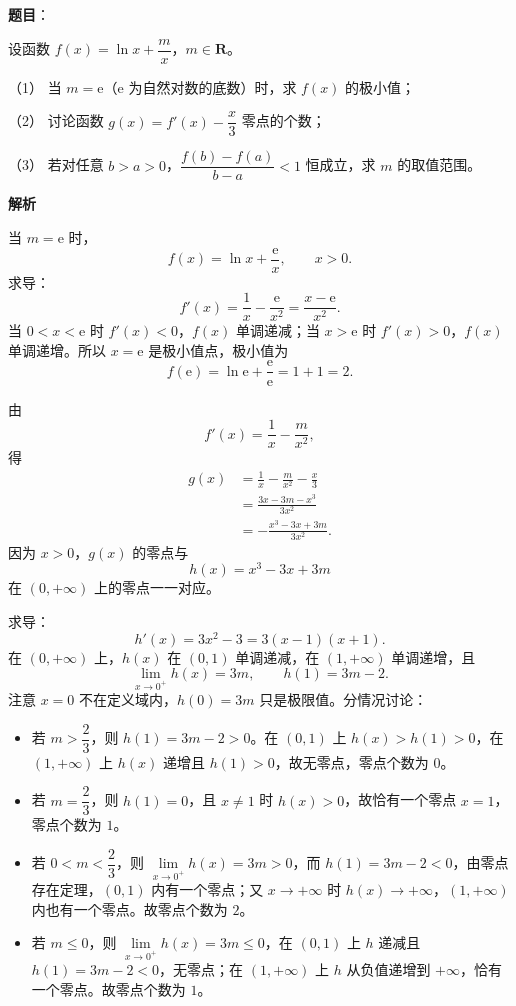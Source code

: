 \begin{answer}

\textbf{题目}：

设函数 $f(x)=\ln x+\dfrac mx$，$m\in\mathbf R$。

（1） 当 $m=\mathrm e$（$\mathrm e$ 为自然对数的底数）时，求 $f(x)$ 的极小值；

（2） 讨论函数 $g(x)=f'(x)-\dfrac x3$ 零点的个数；

（3） 若对任意 $b>a>0$，$\dfrac{f(b)-f(a)}{b-a}<1$ 恒成立，求 $m$ 的取值范围。

\textbf{解析}


当 $m=\mathrm e$ 时，
\nopagebreak[4]
\[f(x)=\ln x+\frac{\mathrm e}{x},\qquad x>0.\]
求导：
\nopagebreak[4]
\[f'(x)=\frac1x-\frac{\mathrm e}{x^2}
=\frac{x-\mathrm e}{x^2}.\]
当 $0<x<\mathrm e$ 时 $f'(x)<0$，$f(x)$ 单调递减；当 $x>\mathrm e$ 时 $f'(x)>0$，$f(x)$ 单调递增。所以 $x=\mathrm e$ 是极小值点，极小值为
\nopagebreak[4]
\[f(\mathrm e)=\ln\mathrm e+\frac{\mathrm e}{\mathrm e}=1+1=2.\]


由
\nopagebreak[4]
\[f'(x)=\frac1x-\frac{m}{x^2},\]
得
\nopagebreak[4]
\[\begin{aligned}
g(x)&=\frac1x-\frac{m}{x^2}-\frac x3\\
&=\frac{3x-3m-x^3}{3x^2}\\
&=-\frac{x^3-3x+3m}{3x^2}.
\end{aligned}\]
因为 $x>0$，$g(x)$ 的零点与
\nopagebreak[4]
\[h(x)=x^3-3x+3m\]
在 $(0,+\infty)$ 上的零点一一对应。

求导：
\nopagebreak[4]
\[h'(x)=3x^2-3=3(x-1)(x+1).\]
在 $(0,+\infty)$ 上，$h(x)$ 在 $(0,1)$ 单调递减，在 $(1,+\infty)$ 单调递增，且
\nopagebreak[4]
\[\lim_{x\to0^+}h(x)=3m,\qquad h(1)=3m-2.\]
注意 $x=0$ 不在定义域内，$h(0)=3m$ 只是极限值。分情况讨论：

\begin{itemize}
\item 若 $m>\dfrac23$，则 $h(1)=3m-2>0$。在 $(0,1)$ 上 $h(x)>h(1)>0$，在 $(1,+\infty)$ 上 $h(x)$ 递增且 $h(1)>0$，故无零点，零点个数为 $0$。
\item 若 $m=\dfrac23$，则 $h(1)=0$，且 $x\neq1$ 时 $h(x)>0$，故恰有一个零点 $x=1$，零点个数为 $1$。
\item 若 $0<m<\dfrac23$，则 $\lim\limits_{x\to0^+}h(x)=3m>0$，而 $h(1)=3m-2<0$，由零点存在定理，$(0,1)$ 内有一个零点；又 $x\to+\infty$ 时 $h(x)\to+\infty$，$(1,+\infty)$ 内也有一个零点。故零点个数为 $2$。
\item 若 $m\leqslant0$，则 $\lim\limits_{x\to0^+}h(x)=3m\leqslant0$，在 $(0,1)$ 上 $h$ 递减且 $h(1)=3m-2<0$，无零点；在 $(1,+\infty)$ 上 $h$ 从负值递增到 $+\infty$，恰有一个零点。故零点个数为 $1$。
\end{itemize}


\end{answer}
